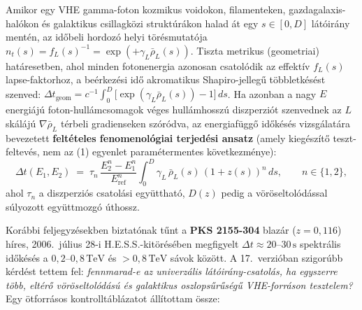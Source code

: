 \documentclass[10pt,a4paper]{article}
\begin{document}
\par
Amikor egy VHE gamma-foton kozmikus voidokon, filamenteken, gazdagalaxis-hal\'okon \'es galaktikus csillagk\"ozi strukt\'ur\'akon halad \'at egy $s \in [0, D]$ l\'at\'oir\'any ment\'en, az id\H{o}beli hordoz\'o helyi t\"or\'esmutat\'oja $n_t(s) = f_L(s)^{-1} = \exp(+\gamma_L \bar{\rho}_L(s))$. Tiszta metrikus (geometriai) hat\'aresetben, ahol minden fotonenergia azonosan csatol\'odik az effekt\'iv $f_L(s)$ lapse-faktorhoz, a be\'erkez\'esi id\H{o} akromatikus Shapiro-jelleg\H{u} t\"obbletk\'es\'est szenved: $\Delta t_{\text{geom}} = c^{-1}\int_0^D \bigl[\exp(\gamma_L\bar{\rho}_L(s)) - 1\bigr]\,ds$. Ha azonban a nagy $E$ energi\'aj\'u foton-hull\'amcsomagok v\'eges hull\'amhossz\'u diszperzi\'ot szenvednek az $L$ sk\'al\'aj\'u $\nabla\bar{\rho}_L$ t\'erbeli gradienseken sz\'or\'odva, az energiaf\"ugg\H{o} id\H{o}k\'es\'es vizsg\'alat\'ara bevezetett \textbf{felt\'eteles fenomenol\'ogiai terjed\'esi ansatz} (amely kieg\'esz\'it\H{o} teszt-feltev\'es, nem az (1) egyenlet param\'etermentes k\"ovetkezm\'enye):
\begin{equation}
  \Delta t(E_1, E_2) \;=\; \tau_n\,\frac{E_2^n - E_1^n}{E_{\text{ref}}^n}\int_0^D \gamma_L\,\bar{\rho}_L(s)\,(1+z(s))^n\,ds, \qquad n \in \{1, 2\},
\end{equation}
ahol $\tau_n$ a diszperzi\'os csatol\'asi egy\"utthat\'o, $D(z)$ pedig a v\"or\"oseltol\'od\'assal s\'ulyozott egy\"uttmozg\'o \'uthossz.

\par
Kor\'abbi feljegyz\'esekben biztat\'onak t\H{u}nt a \textbf{PKS 2155-304} blaz\'ar ($z = 0{,}116$) h\'ires, 2006.\ j\'ulius 28-i H.E.S.S.-kit\"or\'es\'eben megfigyelt $\Delta t \approx 20\text{--}30\,\text{s}$ spektr\'alis id\H{o}k\'es\'es a $0{,}2\text{--}0{,}8\,\text{TeV}$ \'es $>0{,}8\,\text{TeV}$ s\'avok k\"oz\"ott. A 17.\ verzi\'oban szigor\'ubb k\'erd\'est tettem fel: \emph{fennmarad-e az univerz\'alis l\'at\'oir\'any-csatol\'as, ha egyszerre t\"obb, elt\'er\H{o} v\"or\"oseltol\'od\'as\'u \'es galaktikus oszlops\H{u}r\H{u}s\'eg\H{u} VHE-forr\'ason tesztelem?} Egy \"otforr\'asos kontrollt\'abl\'azatot \'all\'itottam \"ossze:
\end{document}

